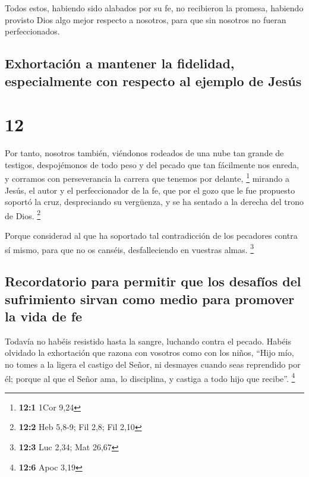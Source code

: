  Todos estos, habiendo sido alabados por su fe, no
recibieron la promesa,  habiendo provisto Dios algo mejor
respecto a nosotros, para que sin nosotros no fueran perfeccionados.

\hypertarget{exhortaciuxf3n-a-mantener-la-fidelidad-especialmente-con-respecto-al-ejemplo-de-jesuxfas}{%
\subsection{Exhortación a mantener la fidelidad, especialmente con
respecto al ejemplo de
Jesús}\label{exhortaciuxf3n-a-mantener-la-fidelidad-especialmente-con-respecto-al-ejemplo-de-jesuxfas}}

\hypertarget{section-11}{%
\section{12}\label{section-11}}

 Por tanto, nosotros también, viéndonos rodeados de una
nube tan grande de testigos, despojémonos de todo peso y del pecado que
tan fácilmente nos enreda, y corramos con perseverancia la carrera que
tenemos por delante, \footnote{\textbf{12:1} 1Cor 9,24} 
mirando a Jesús, el autor y el perfeccionador de la fe, que por el gozo
que le fue propuesto soportó la cruz, despreciando su vergüenza, y se ha
sentado a la derecha del trono de Dios. \footnote{\textbf{12:2} Heb
  5,8-9; Fil 2,8; Fil 2,10}

 Porque considerad al que ha soportado tal contradicción
de los pecadores contra sí mismo, para que no os canséis, desfalleciendo
en vuestras almas. \footnote{\textbf{12:3} Luc 2,34; Mat 26,67}

\hypertarget{recordatorio-para-permitir-que-los-desafuxedos-del-sufrimiento-sirvan-como-medio-para-promover-la-vida-de-fe}{%
\subsection{Recordatorio para permitir que los desafíos del sufrimiento
sirvan como medio para promover la vida de
fe}\label{recordatorio-para-permitir-que-los-desafuxedos-del-sufrimiento-sirvan-como-medio-para-promover-la-vida-de-fe}}

 Todavía no habéis resistido hasta la sangre, luchando
contra el pecado.  Habéis olvidado la exhortación que
razona con vosotros como con los niños, ``Hijo mío, no tomes a la ligera
el castigo del Señor, ni desmayes cuando seas reprendido por él;
 porque al que el Señor ama, lo disciplina, y castiga a
todo hijo que recibe''. \footnote{\textbf{12:6} Apoc 3,19}

